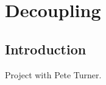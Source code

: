 \chapter{Decoupling}
\label{ch:Decoupling}

\section{Introduction}
\label{sec:DCIntro}
Project with Pete Turner.
